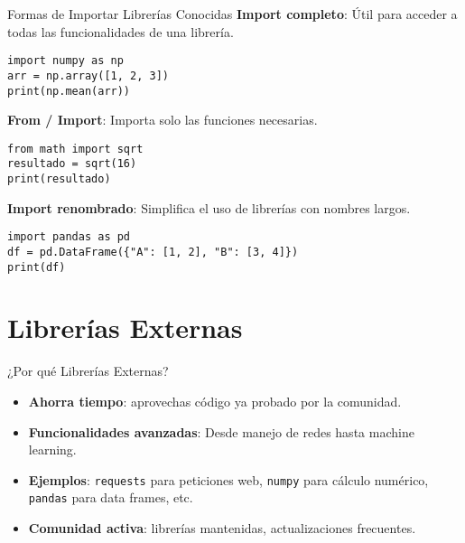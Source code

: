 \documentclass[10pt]{beamer}
\begin{document}
\begin{frame}[fragile]{Formas de Importar Librerías Conocidas}
\textbf{Import completo}: Útil para acceder a todas las funcionalidades de una librería.
\begin{verbatim}
import numpy as np
arr = np.array([1, 2, 3])
print(np.mean(arr))
\end{verbatim}

\textbf{From / Import}: Importa solo las funciones necesarias.
\begin{verbatim}
from math import sqrt
resultado = sqrt(16)
print(resultado)
\end{verbatim}

\textbf{Import renombrado}: Simplifica el uso de librerías con nombres largos.
\begin{verbatim}
import pandas as pd
df = pd.DataFrame({"A": [1, 2], "B": [3, 4]})
print(df)
\end{verbatim}

\end{frame}

\section{Librerías Externas}

\begin{frame}{¿Por qué Librerías Externas?}
  \begin{itemize}
    \item \textbf{Ahorra tiempo}: aprovechas código ya probado por la comunidad.
    \item \textbf{Funcionalidades avanzadas}: Desde manejo de redes hasta machine learning.
    \item \textbf{Ejemplos}: \texttt{requests} para peticiones web, \texttt{numpy} para cálculo numérico, \texttt{pandas} para data frames, etc.
    \item \textbf{Comunidad activa}: librerías mantenidas, actualizaciones frecuentes.
  \end{itemize}
\end{frame}
\end{document}
